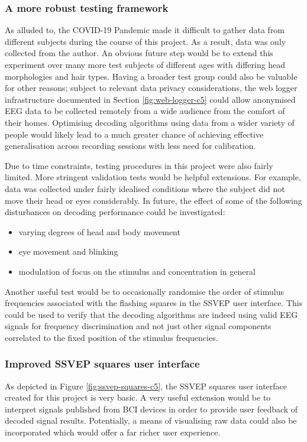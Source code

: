\subsubsection{A more robust testing framework}
As alluded to, the COVID-19 Pandemic made it difficult to gather data from different subjects during the course of this project. As a result, data was only collected from the author. An obvious future step would be to extend this experiment over many more test subjects of different ages with differing head morphologies and hair types. Having a broader test group could also be valuable for other reasons; subject to relevant data privacy considerations, the web logger infrastructure documented in Section \ref{fig:web-logger-c5} could allow anonymised EEG data to be collected remotely from a wide audience from the comfort of their homes. Optimising decoding algorithms using data from a wider variety of people would likely lead to a much greater chance of achieving effective generalisation across recording sessions with less need for calibration. 

Due to time constraints, testing procedures in this project were also fairly limited. More stringent validation tests would be helpful extensions. For example, data was collected under fairly idealised conditions where the subject did not move their head or eyes considerably. In future, the effect of some of the following disturbances on decoding performance could be investigated:
\begin{itemize}
    \item varying degrees of head and body movement
    \item eye movement and blinking
    \item modulation of focus on the stimulus and concentration in general
\end{itemize}
Another useful test would be to occasionally randomise the order of stimulus frequencies associated with the flashing squares in the SSVEP user interface. This could be used to verify that the decoding algorithms are indeed using valid EEG signals for frequency discrimination and not just other signal components correlated to the fixed position of the stimulus frequencies. 

\subsubsection{Improved SSVEP squares user interface}
As depicted in Figure \ref{fig:ssvep-squares-c5}, the SSVEP squares user interface created for this project is very basic. A very useful extension would be to interpret signals published from BCI devices in order to provide user feedback of decoded signal results. Potentially, a means of visualising raw data could also be incorporated which would offer a far richer user experience. 

